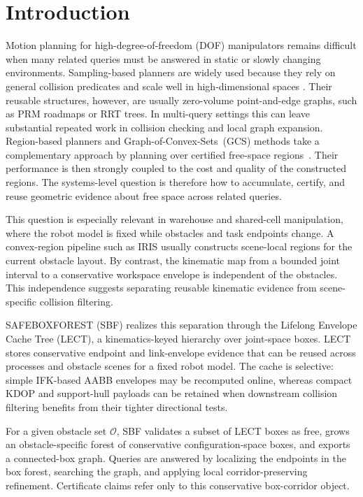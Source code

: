 \documentclass[journal]{IEEEtran}
\DeclareRobustCommand{\textsc}[1]{\textnormal{\MakeUppercase{#1}}}
\begin{document}
\section{Introduction}\label{sec:intro}

Motion planning for high-degree-of-freedom (DOF) manipulators remains difficult
when many related queries must be answered in static or slowly changing
environments. Sampling-based planners are widely used because they rely on
general collision predicates and scale well in high-dimensional spaces
\cite{lavalle2006planning,lavalle1998rapidly,kavraki1996probabilistic,
karaman2011sampling}. Their reusable structures, however, are usually
zero-volume point-and-edge graphs, such as PRM roadmaps or RRT trees. In
multi-query settings this can leave substantial repeated work in collision
checking and local graph expansion. Region-based planners and
Graph-of-Convex-Sets~(GCS) methods take a complementary approach by planning
over certified free-space regions~\cite{deits2015computing,
marcucci2023motion,marcucci2024shortest}. Their performance is then strongly
coupled to the cost and quality of the constructed regions. The systems-level
question is therefore how to accumulate, certify, and reuse geometric evidence
about free space across related queries.

This question is especially relevant in warehouse and shared-cell manipulation,
where the robot model is fixed while obstacles and task endpoints change. A
convex-region pipeline such as IRIS usually constructs scene-local regions for
the current obstacle layout. By contrast, the kinematic map from a bounded
joint interval to a conservative workspace envelope is independent of the
obstacles. This independence suggests separating reusable kinematic evidence
from scene-specific collision filtering.

\textsc{SafeBoxForest} (SBF) realizes this separation through the Lifelong
Envelope Cache Tree (LECT), a kinematics-keyed hierarchy over joint-space
boxes. LECT stores conservative endpoint and link-envelope evidence that can
be reused across processes and obstacle scenes for a fixed robot model. The
cache is selective: simple IFK-based AABB envelopes may be recomputed online,
whereas compact KDOP and support-hull payloads can be retained when downstream
collision filtering benefits from their tighter directional tests.

For a given obstacle set $\mathcal{O}$, SBF validates a subset of LECT boxes as
free, grows an obstacle-specific forest of conservative configuration-space
boxes, and exports a connected-box graph. Queries are answered by localizing
the endpoints in the box forest, searching the graph, and applying local
corridor-preserving refinement. Certificate claims refer only to this
conservative box-corridor object.
\end{document}
